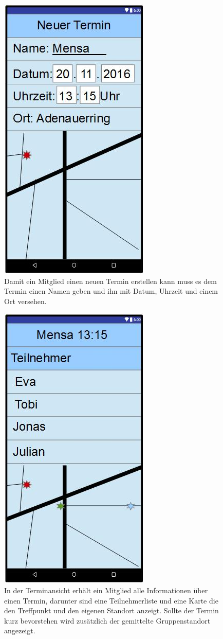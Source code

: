 \documentclass{scrartcl}
\begin{document}
	\newpage
	\begin{figure}[h]
		\centering
		\includegraphics[width=.5\textwidth]{GUI_NeuerTermin.jpg}
		\caption{Damit ein \gls{Mitglied} einen neuen Termin erstellen kann muss es dem Termin einen Namen geben und ihn mit Datum, Uhrzeit und einem Ort versehen.}
	\end{figure}
	
	\newpage
	\begin{figure}[h]
		\centering
		\includegraphics[width=.5\textwidth]{GUI_Termin.jpg}
		\caption{In der Terminansicht erhält ein \gls{Mitglied} alle Informationen über einen Termin, darunter sind eine Teilnehmerliste und eine Karte die den Treffpunkt und den eigenen Standort anzeigt. Sollte der Termin kurz bevorstehen wird zusätzlich der gemittelte Gruppenstandort angezeigt.}
	\end{figure}
	
	
\newpage
	


\appendix
%
%
\printindex
\glsaddall
\printglossaries
	
\end{document}
